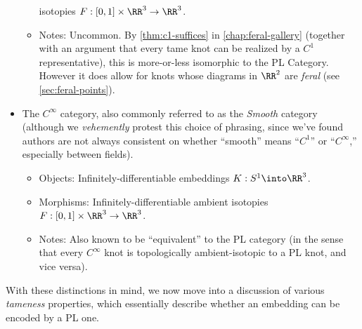 \begin{itemize}
\begin{itemize}
        isotopies $F : [0,1] \times \RR^3 \to
        \RR^3$.
      \item Notes: Uncommon. By \cref{thm:c1-suffices} in
        \cref{chap:feral-gallery} (together with an argument that
        every tame knot can be realized by a $C^1$ representative),
        this is more-or-less isomorphic to the PL Category. However it
        does allow for knots whose diagrams in $\RR^2$ are
        \emph{feral} (see \cref{sec:feral-points}).
    \end{itemize}
  \item The $C^\infty$ category, also commonly referred to as the
    \emph{Smooth} category (although we \emph{vehemently} protest this
    choice of phrasing, since we've found authors are not always
    consistent on whether ``smooth'' means ``$C^1$'' or
    ``$C^\infty$,'' especially between fields).
    \begin{itemize}
      \item Objects: Infinitely-differentiable embeddings $K : S^1
        \into \RR^3$.
      \item Morphisms: Infinitely-differentiable ambient isotopies $F
        : [0,1] \times \RR^3 \to \RR^3$.
      \item Notes: Also known to be ``equivalent'' to the PL category
        (in the sense that every $C^\infty$ knot is topologically
        ambient-isotopic to a PL knot, and vice versa).
    \end{itemize}
\end{itemize}



With these distinctions in mind, we now move into a discussion of
various \emph{tameness} properties, which essentially describe whether
an embedding can be encoded by a PL one.

